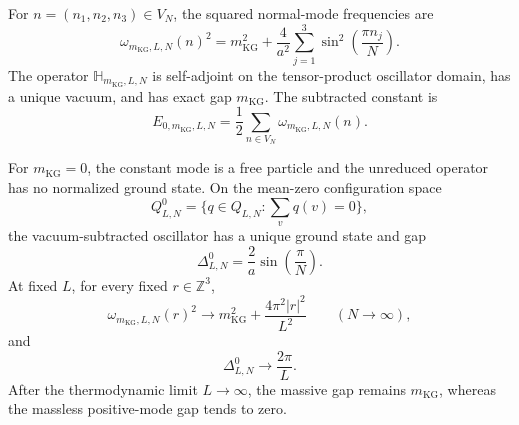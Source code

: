 \begin{theorem}
\label{hnsp-regulator-theorem}
For \(n=(n_1,n_2,n_3)\in V_N\), the squared normal-mode frequencies are
\begin{equation}
 \omega_{m_{\mathrm{KG}},L,N}(n)^2
 =m_{\mathrm{KG}}^2+\frac4{a^2}\sum_{j=1}^3
 \sin^2\!\left(\frac{\pi n_j}{N}\right).
 \label{hnsp-lattice-dispersion}
\end{equation}
The operator \(\mathbb H_{m_{\mathrm{KG}},L,N}\) is self-adjoint on the tensor-product
oscillator domain, has a unique vacuum, and has exact gap \(m_{\mathrm{KG}}\).  The
subtracted constant is
\begin{equation}
 E_{0,m_{\mathrm{KG}},L,N}
 =\frac12\sum_{n\in V_N}\omega_{m_{\mathrm{KG}},L,N}(n).
 \label{hnsp-regulated-vacuum-energy}
\end{equation}

For \(m_{\mathrm{KG}}=0\), the constant mode is a free particle and the unreduced operator
has no normalized ground state.  On the mean-zero configuration space
\begin{equation}
 Q^0_{L,N}=\{q\in Q_{L,N}:\textstyle\sum_v q(v)=0\},
 \label{hnsp-mean-zero-space}
\end{equation}
the vacuum-subtracted oscillator has a unique ground state and gap
\begin{equation}
 \Delta^0_{L,N}=\frac2a\sin\!\left(\frac\pi N\right).
 \label{hnsp-massless-regulated-gap}
\end{equation}
At fixed \(L\), for every fixed \(r\in\mathbb Z^3\),
\begin{equation}
 \omega_{m_{\mathrm{KG}},L,N}(r)^2\longrightarrow
 m_{\mathrm{KG}}^2+\frac{4\pi^2|r|^2}{L^2}\qquad(N\to\infty),
 \label{hnsp-fixed-box-limit}
\end{equation}
and
\begin{equation}
 \Delta^0_{L,N}\longrightarrow\frac{2\pi}{L}.
 \label{hnsp-fixed-box-gap-limit}
\end{equation}
After the thermodynamic limit \(L\to\infty\), the massive gap remains
\(m_{\mathrm{KG}}\), whereas the massless positive-mode gap tends to zero.
\end{theorem}

